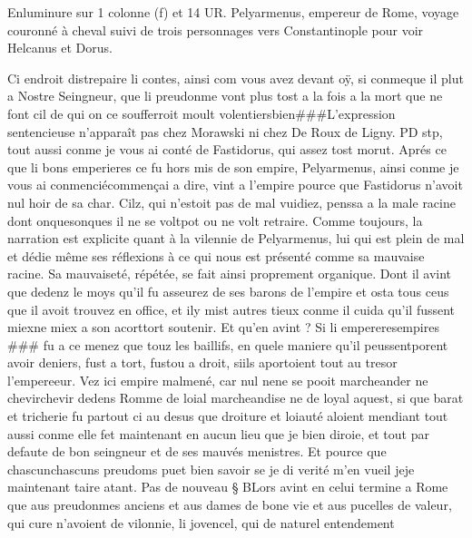 \documentclass{article}
\begin{document}
\begin{pages}
               Enluminure sur 1 colonne (f) et 14 UR.
                  Pelyarmenus, empereur de Rome, 
                  voyage couronné à cheval suivi de trois personnages vers 
                  Constantinople pour voir 
                  Helcanus et Dorus. 
               
            
            \pstart Ci endroit distrepaire 
   li contes, ainsi com vous avez devant oÿ, si conmeque il plut a 
   Nostre Seingneur, que li preudonme vont plus tost a la fois a la mort que ne font cil 
      de qui on ce soufferroit moult volentiersbien###L'expression 
         sentencieuse n'apparaît pas chez Morawski ni chez De Roux de Ligny. PD stp, 
   tout aussi conme je vous ai conté de 
   Fastidorus, qui assez tost morut. Aprés ce que 
   li bons emperieres ce fu hors mis de son empire, 
   Pelyarmenus, ainsi conme je vous 
      ai conmenciécommençai a dire, 
   vint a l’empire pource que Fastidorus n’avoit nul hoir de sa char. Cilz, qui n’estoit pas de mal 
   vuidiez, penssa a la male racine dont onquesonques il ne se 
   voltpot ou ne volt retraire.
               Comme toujours, la narration est explicite quant à la vilennie de Pelyarmenus, 
               lui qui est plein de mal et dédie même ses réflexions à ce qui nous est présenté comme sa mauvaise racine. 
               Sa mauvaiseté, répétée, se fait ainsi proprement organique.
               Dont il avint que dedenz le moys 
   qu’il fu asseurez de ses 
   barons de l’empire et osta tous ceus que il avoit trouvez en office, 
   et ily mist autres tieux conme il cuida qu’il fussent 
   miexne miex 
   a son acorttort soutenir. Et qu’en avint ? Si 
   li empereresempires 
   ### fu a ce menez 
   que touz les baillifs, en quele maniere qu’il peussentporent avoir deniers, 
   fust a tort, fustou a droit, 
   siils aportoient tout au tresor 
   l’empereeur. Vez ici empire malmené, car nul 
   nene se pooit 
   marcheander ne 
   chevirchevir dedens Romme 
   de loial marcheandise ne de loyal aquest, si que barat et tricherie fu partout ci au desus que droiture et loiauté aloient mendiant 
   tout aussi conme elle fet maintenant en aucun lieu que je bien diroie, et tout par defaute de bon seingneur 
   et de ses mauvés menistres. Et pource que 
      chascunchascuns preudoms puet bien savoir 
      se je di verité m’en vueil jeje maintenant taire atant. \pend
\pstart Pas de nouveau § BLors avint en celui termine a 
   Rome que aus preudonmes anciens 
   et aus dames de bone vie et aus pucelles de valeur, qui cure n’avoient de vilonnie, li jovencel, qui de naturel entendement 

\end{pages}
\end{document}
